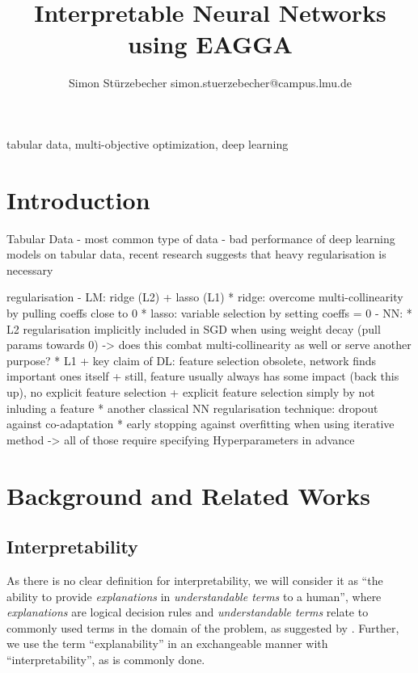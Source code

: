 \documentclass[twoside,11pt]{article}
\begin{document}
\title{Interpretable Neural Networks using EAGGA}

\author{\name Simon Stürzebecher \email simon.stuerzebecher@campus.lmu.de}


\maketitle

\begin{abstract}%
\end{abstract}

\begin{keywords}
  tabular data, multi-objective optimization, deep learning
\end{keywords}

\section{Introduction}
Tabular Data
- most common type of data
- bad performance of deep learning models on tabular data, recent research suggests that heavy regularisation is necessary

regularisation
- LM: ridge (L2) + lasso (L1)
  * ridge: overcome multi-collinearity by pulling coeffs close to 0
  * lasso: variable selection by setting coeffs = 0
- NN:
  * L2 regularisation implicitly included in SGD when using weight decay (pull params towards 0) -> does this combat multi-collinearity as well or serve another purpose?
  * L1
    + key claim of DL: feature selection obsolete, network finds important ones itself
    + still, feature usually always has some impact (back this up), no explicit feature selection
    + explicit feature selection simply by not inluding a feature
  * another classical NN regularisation technique: dropout against co-adaptation
  * early stopping against overfitting when using iterative method
-> all of those require specifying Hyperparameters in advance



\section{Background and Related Works}

\subsection{Interpretability}
As there is no clear definition for interpretability, we will consider it as ``the ability to provide \textit{explanations} in \textit{understandable terms} to a human'',
where \textit{explanations} are logical decision rules and \textit{understandable terms} relate to commonly used terms in the domain of the problem,
as suggested by \citet[chap. 1]{survey_NN_interpretability}.
Further, we use the term ``explanability'' in an exchangeable manner with ``interpretability'', as is commonly done.
\end{document}
